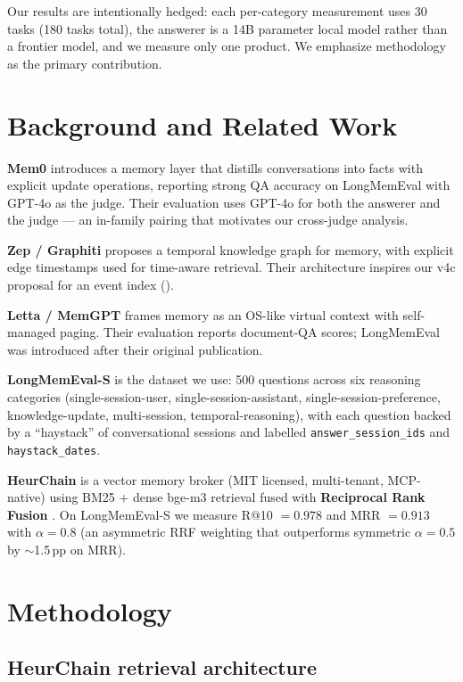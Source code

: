 \documentclass{article}
\begin{document}
Our results are intentionally hedged: each per-category measurement uses 30 tasks (180 tasks total), the answerer is a 14B parameter local model rather than a frontier model, and we measure only one product. We emphasize methodology as the primary contribution.

\section{Background and Related Work}
\label{sec:related}

\textbf{Mem0} \citep{mem0_2025} introduces a memory layer that distills conversations into facts with explicit update operations, reporting strong QA accuracy on LongMemEval with GPT-4o as the judge. Their evaluation uses GPT-4o for both the answerer and the judge --- an in-family pairing that motivates our cross-judge analysis.

\textbf{Zep / Graphiti} \citep{zep_2025} proposes a temporal knowledge graph for memory, with explicit edge timestamps used for time-aware retrieval. Their architecture inspires our v4c proposal for an event index ().

\textbf{Letta / MemGPT} \citep{memgpt_2023} frames memory as an OS-like virtual context with self-managed paging. Their evaluation reports document-QA scores; LongMemEval was introduced after their original publication.

\textbf{LongMemEval-S} \citep{longmemeval_2025} is the dataset we use: 500 questions across six reasoning categories (single-session-user, single-session-assistant, single-session-preference, knowledge-update, multi-session, temporal-reasoning), with each question backed by a ``haystack'' of conversational sessions and labelled \texttt{answer\_session\_ids} and \texttt{haystack\_dates}.

\textbf{HeurChain} \citep{heurchain_repo} is a vector memory broker (MIT licensed, multi-tenant, MCP-native) using BM25 + dense bge-m3 \citep{bgem3_2024} retrieval fused with \textbf{Reciprocal Rank Fusion} \citep{rrf_2009}. On LongMemEval-S we measure R@10 $= 0.978$ and MRR $= 0.913$ with $\alpha = 0.8$ (an asymmetric RRF weighting that outperforms symmetric $\alpha = 0.5$ by $\sim$1.5\,pp on MRR).

\section{Methodology}
\label{sec:method}

\subsection{HeurChain retrieval architecture}
\end{document}
